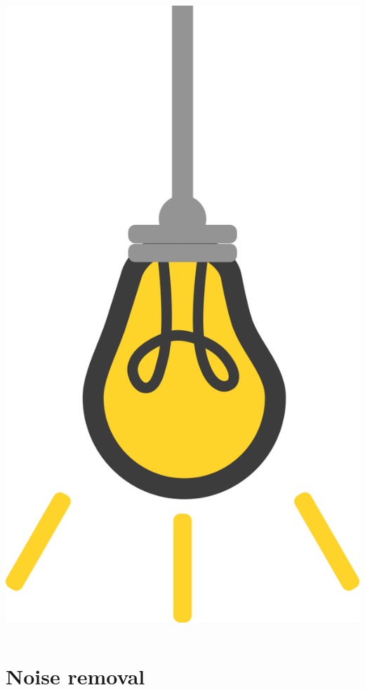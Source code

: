 \documentclass[9pt, aspectratio=169]{beamer}
\begin{document}
\begin{frame}
\begin{columns}
\begin{column}{0.2\textwidth}
            \includegraphics[angle=-30, origin=tr, width=1.5\textwidth]{lightbulb.png}
        \end{column}
    \end{columns}
\end{frame}

\section{Noise removal}
\end{document}
